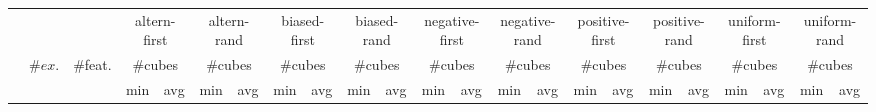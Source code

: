 \begin{tabular}{lccrrrrrrrrrrrrrrrrrrrr}
\toprule
& && \multicolumn{2}{c}{altern-first} & \multicolumn{2}{c}{altern-rand} & \multicolumn{2}{c}{biased-first} & \multicolumn{2}{c}{biased-rand} & \multicolumn{2}{c}{negative-first} & \multicolumn{2}{c}{negative-rand} & \multicolumn{2}{c}{positive-first} & \multicolumn{2}{c}{positive-rand} & \multicolumn{2}{c}{uniform-first} & \multicolumn{2}{c}{uniform-rand}\\
\cmidrule(rr){4-5}\cmidrule(rr){6-7}\cmidrule(rr){8-9}\cmidrule(rr){10-11}\cmidrule(rr){12-13}\cmidrule(rr){14-15}\cmidrule(rr){16-17}\cmidrule(rr){18-19}\cmidrule(rr){20-21}\cmidrule(rr){22-23}
&\multirow{2}{*}{$\#ex.$} & \multirow{2}{*}{\#feat.} &  \multicolumn{2}{c}{\#cubes} & \multicolumn{2}{c}{\#cubes} & \multicolumn{2}{c}{\#cubes} & \multicolumn{2}{c}{\#cubes} & \multicolumn{2}{c}{\#cubes} & \multicolumn{2}{c}{\#cubes} & \multicolumn{2}{c}{\#cubes} & \multicolumn{2}{c}{\#cubes} & \multicolumn{2}{c}{\#cubes} & \multicolumn{2}{c}{\#cubes} \\\cmidrule(rl){4-5}\cmidrule(rl){6-7}\cmidrule(rl){8-9}\cmidrule(rl){10-11}\cmidrule(rl){12-13}\cmidrule(rl){14-15}\cmidrule(rl){16-17}\cmidrule(rl){18-19}\cmidrule(rl){20-21}\cmidrule(rl){22-23}
&& & \multicolumn{1}{c}{min} & \multicolumn{1}{c}{avg} & \multicolumn{1}{c}{min} & \multicolumn{1}{c}{avg} & \multicolumn{1}{c}{min} & \multicolumn{1}{c}{avg} & \multicolumn{1}{c}{min} & \multicolumn{1}{c}{avg} & \multicolumn{1}{c}{min} & \multicolumn{1}{c}{avg} & \multicolumn{1}{c}{min} & \multicolumn{1}{c}{avg} & \multicolumn{1}{c}{min} & \multicolumn{1}{c}{avg} & \multicolumn{1}{c}{min} & \multicolumn{1}{c}{avg} & \multicolumn{1}{c}{min} & \multicolumn{1}{c}{avg} & \multicolumn{1}{c}{min} & \multicolumn{1}{c}{avg} \\
\midrule


\end{tabular}
